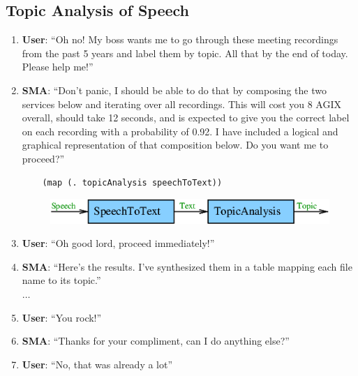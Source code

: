 \documentclass[]{article}
\begin{document}
\subsection{Topic Analysis of Speech}
\begin{enumerate}
\item \textbf{User}: ``Oh no!  My boss wants me to go through these
  meeting recordings from the past 5 years and label them by topic.
  All that by the end of today.  Please help me!''
\item \textbf{SMA}: ``Don't panic, I should be able to do that by
  composing the two services below and iterating over all recordings.
  This will cost you 8 AGIX overall, should take 12 seconds, and is
  expected to give you the correct label on each recording with a
  probability of 0.92.  I have included a logical and graphical
  representation of that composition below.  Do you want me to
  proceed?''
  \begin{verbatim}
    (map (. topicAnalysis speechToText))
  \end{verbatim}
  \begin{figure}[H]
    \centering
    \includegraphics[scale=0.55]{figs/SpeechTopicAnalysis.png}
  \end{figure}
\item \textbf{User}: ``Oh good lord, proceed immediately!''
\item \textbf{SMA}: ``Here's the results.  I've synthesized them in a
  table mapping each file name to its topic.''\\
  $\dots$
\item \textbf{User}: ``You rock!''
\item \textbf{SMA}: ``Thanks for your compliment, can I do anything
  else?''
\item \textbf{User}: ``No, that was already a lot''
\end{enumerate}
\end{document}
